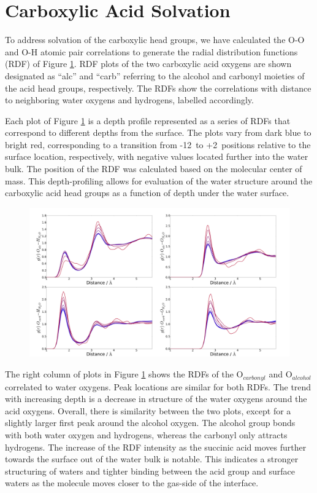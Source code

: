 \section {Carboxylic Acid Solvation}

To address solvation of the carboxylic head groups, we have calculated the O-O and O-H atomic pair correlations to generate the radial distribution functions (RDF) of Figure \ref{fig:rdfs}. RDF plots of the two carboxylic acid oxygens are shown designated as ``alc'' and ``carb'' referring to the alcohol and carbonyl moieties of the acid head groups, respectively. The RDFs show the correlations with distance to neighboring water oxygens and hydrogens, labelled accordingly.

Each plot of Figure \ref{fig:rdfs} is a depth profile represented as a series of RDFs that correspond to different depths from the surface. The plots vary from dark blue to bright red, corresponding to a transition from -12\angs~to +2\angs~positions relative to the surface location, respectively, with negative values located further into the water bulk. The position of the RDF was calculated based on the molecular center of mass. This depth-profiling allows for evaluation of the water structure around the carboxylic acid head groups as a function of depth under the water surface.

\begin{figure}[h!]
	\begin{center}
		\includegraphics[scale=1.0]{images/rdf/rdf-collection.png}
		\caption{}
		\label{fig:rdfs}
	\end{center}
\end{figure}

The right column of plots in Figure \ref{fig:rdfs} shows the RDFs of the O$_{carbonyl}$ and O$_{alcohol}$ correlated to water oxygens. Peak locations are similar for both RDFs. The trend with increasing depth is a decrease in structure of the water oxygens around the acid oxygens. Overall, there is similarity between the two plots, except for a slightly larger first peak around the alcohol oxygen. The alcohol group bonds with both water oxygen and hydrogens, whereas the carbonyl only attracts hydrogens. The increase of the RDF intensity as the succinic acid moves further towards the surface out of the water bulk is notable. This indicates a stronger structuring of waters and tighter binding between the acid group and surface waters as the molecule moves closer to the gas-side of the interface.

